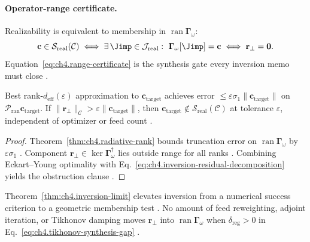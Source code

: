\paragraph{Operator-range certificate.}
Realizability is equivalent to membership in \(\operatorname{ran}\boldsymbol{\Gamma}_\omega\):
\begin{equation}
\label{eq:ch4.range-certificate}
\mathbf{c}\in\mathcal{S}_{\mathrm{real}}(\mathcal{C})
\iff
\exists\,\Jimp\in\mathcal{J}_{\mathrm{real}}:\ \boldsymbol{\Gamma}_\omega[\Jimp]=\mathbf{c}
\iff
\mathbf{r}_{\perp}=\mathbf{0}.
\end{equation}
Equation~\eqref{eq:ch4.range-certificate} is the synthesis gate every inversion memo must close \cite{stratton1941,harrington2001,devaney2004,hansen1988}.

\begin{theorem}
\label{thm:ch4.inversion-limit}
Best rank-\(d_{\mathrm{eff}}(\varepsilon)\) approximation to \(\mathbf{c}_{\mathrm{target}}\) achieves error
\(\le\varepsilon\sigma_{1}\|\mathbf{c}_{\mathrm{target}}\|\) on \(\mathcal{P}_{\mathrm{ran}}\mathbf{c}_{\mathrm{target}}\). If
\(\|\mathbf{r}_{\perp}\|_{\mathcal{C}}>\varepsilon\|\mathbf{c}_{\mathrm{target}}\|\), then
\(\mathbf{c}_{\mathrm{target}}\notin\mathcal{S}_{\mathrm{real}}(\mathcal{C})\) at tolerance \(\varepsilon\), independent of optimizer or feed count
\cite{stratton1941,harrington2001,devaney2004,hansen1988}.
\end{theorem}
\begin{proof}
Theorem~\ref{thm:ch4.radiative-rank} bounds truncation error on \(\operatorname{ran}\boldsymbol{\Gamma}_\omega\) by \(\varepsilon\sigma_{1}\)
\cite{harrington2001,stratton1941}. Component \(\mathbf{r}_{\perp}\in\ker\boldsymbol{\Gamma}_\omega^{\dagger}\) lies outside range for all ranks
\cite{devaney2004}. Combining Eckart--Young optimality with Eq.~\eqref{eq:ch4.inversion-residual-decomposition} yields the obstruction clause
\cite{hansen1988,harrington2001}.
\end{proof}

Theorem~\ref{thm:ch4.inversion-limit} elevates inversion from a numerical success criterion to a geometric membership test \cite{stratton1941}. No
amount of feed reweighting, adjoint iteration, or Tikhonov damping moves \(\mathbf{r}_{\perp}\) into \(\operatorname{ran}\boldsymbol{\Gamma}_\omega\)
when \(\delta_{\mathrm{reg}}>0\) in Eq.~\eqref{eq:ch4.tikhonov-synthesis-gap} \cite{harrington2001,devaney2004,hansen1988}.

